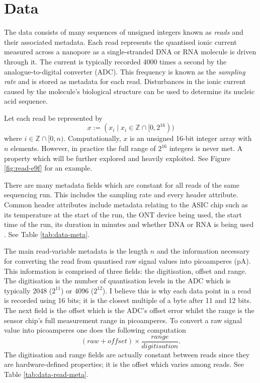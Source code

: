 \chapter{Data} \label{chap:data}




The data consists of many sequences of unsigned integers known as \textit{reads} and their associated metadata. Each read represents the quantised ionic current measured across a nanopore as a single-stranded DNA or RNA molecule is driven through it. The current is typically recorded 4000 times a second by the analogue-to-digital converter (ADC). This frequency is known as the \textit{sampling rate} and is stored as metadata for each read. Disturbances in the ionic current caused by the molecule's biological structure can be used to determine its nucleic acid sequence.

Let each read be represented by
\[ x := (x_i\mid x_i \in \mathbb{Z} \cap [0, 2^{16})) \]
where $i\in \mathbb{Z}\cap [0, n)$. Computationally, $x$ is an unsigned 16-bit integer array with $n$ elements. However, in practice the full range of $2^{16}$ integers is never met. A property which will be further explored and heavily exploited. See Figure \ref{fig:read-e9f} for an example.

There are many metadata fields which are constant for all reads of the same sequencing run. This includes the sampling rate and every header attribute. Common header attributes include metadata relating to the ASIC chip such as its temperature at the start of the run, the ONT device being used, the start time of the run, its duration in minutes and whether DNA or RNA is being used \cite{slow5-spec}. See Table \ref{tab:data-meta}.




The main read-variable metadata is the length $n$ and the information necessary for converting the read from quantised raw signal values into picoamperes (pA). This information is comprised of three fields: the digitisation, offset and range. The digitisation is the number of quantisation levels in the ADC which is typically 2048 ($2^{11}$) or 4096 ($2^{12}$). I believe this is why each data point in a read is recorded using 16 bits; it is the closest multiple of a byte after 11 and 12 bits. The next field is the offset which is the ADC's offset error whilst the range is the sensor chip's full measurement range in picoamperes. To convert a raw signal value into picoamperes one does the following computation
\[ (raw + offset) \times \frac{range}{digitisation}. \] The digitisation and range fields are actually constant between reads since they are hardware-defined properties; it is the offset which varies among reads. See Table \ref{tab:data-read-meta}.

